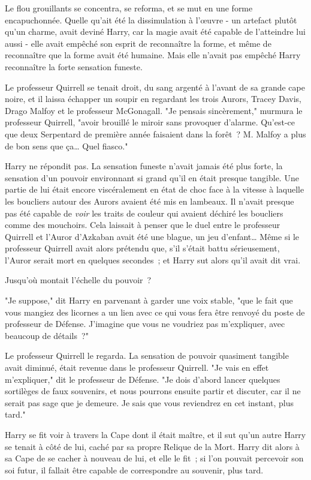 Le flou grouillants se concentra, se reforma, et se mut en une forme encapuchonnée. Quelle qu'ait été la dissimulation à l'œuvre - un artefact plutôt qu'un charme, avait deviné Harry, car la magie avait été capable de l'atteindre lui aussi - elle avait empêché son esprit de reconnaître la forme, et même de reconnaître que la forme avait été humaine. Mais elle n'avait pas empêché Harry reconnaître la forte sensation funeste.

Le professeur Quirrell se tenait droit, du sang argenté à l'avant de sa grande cape noire, et il laissa échapper un soupir en regardant les trois Aurors, Tracey Davis, Drago Malfoy et le professeur McGonagall. "Je pensais sincèrement," murmura le professeur Quirrell, "avoir brouillé le miroir sans provoquer d'alarme. Qu'est-ce que deux Serpentard de première année faisaient dans la forêt~? M. Malfoy a plus de bon sens que ça… Quel fiasco."

Harry ne répondit pas. La sensation funeste n'avait jamais été plus forte, la sensation d'un pouvoir environnant si grand qu'il en était presque tangible. Une partie de lui était encore viscéralement en état de choc face à la vitesse à laquelle les boucliers autour des Aurors avaient été mis en lambeaux. Il n'avait presque pas été capable de \emph{voir} les traits de couleur qui avaient déchiré les boucliers comme des mouchoirs. Cela laissait à penser que le duel entre le professeur Quirrell et l'Auror d'Azkaban avait été une blague, un jeu d'enfant… Même si le professeur Quirrell avait alors prétendu que, s'il s'était battu sérieusement, l'Auror serait mort en quelques secondes~; et Harry sut alors qu'il avait dit vrai.

Jusqu'où montait l'échelle du pouvoir~?

"Je suppose," dit Harry en parvenant à garder une voix stable, "que le fait que vous mangiez des licornes a un lien avec ce qui vous fera être renvoyé du poste de professeur de Défense. J'imagine que vous ne voudriez pas m'expliquer, avec beaucoup de détails~?"

Le professeur Quirrell le regarda. La sensation de pouvoir quasiment tangible avait diminué, était revenue dans le professeur Quirrell. "Je vais en effet m'expliquer," dit le professeur de Défense. "Je dois d'abord lancer quelques sortilèges de faux souvenirs, et nous pourrons ensuite partir et discuter, car il ne serait pas sage que je demeure. Je sais que vous reviendrez en cet instant, plus tard."

Harry se fit voir à travers la Cape dont il était maître, et il sut qu'un autre Harry se tenait à côté de lui, caché par sa propre Relique de la Mort. Harry dit alors à sa Cape de se cacher à nouveau de lui, et elle le fit~; si l'on pouvait percevoir son soi futur, il fallait être capable de correspondre au souvenir, plus tard.


